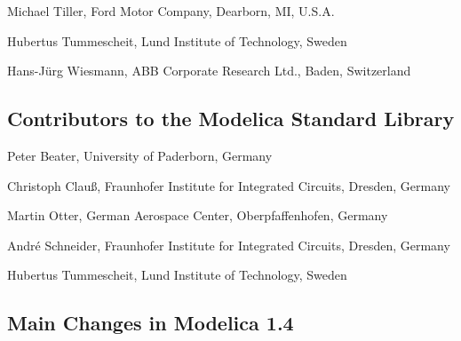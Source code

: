 \documentclass[10pt,a4paper]{report}
\def\doublelabel#1{\label{#1}}
\begin{document}
Michael Tiller, Ford Motor Company, Dearborn, MI, U.S.A.

Hubertus Tummescheit, Lund Institute of Technology, Sweden

Hans-Jürg Wiesmann, ABB Corporate Research Ltd., Baden, Switzerland

\subsection{Contributors to the Modelica Standard Library}\doublelabel{contributors-to-the-modelica-standard-library}
\indent\indent
Peter Beater, University of Paderborn, Germany

Christoph Clauß, Fraunhofer Institute for Integrated Circuits, Dresden,
Germany

Martin Otter, German Aerospace Center, Oberpfaffenhofen, Germany

André Schneider, Fraunhofer Institute for Integrated Circuits, Dresden,
Germany

Hubertus Tummescheit, Lund Institute of Technology, Sweden

\subsection{Main Changes in Modelica 1.4}\doublelabel{main-changes-in-modelica-1-4}
\end{document}
